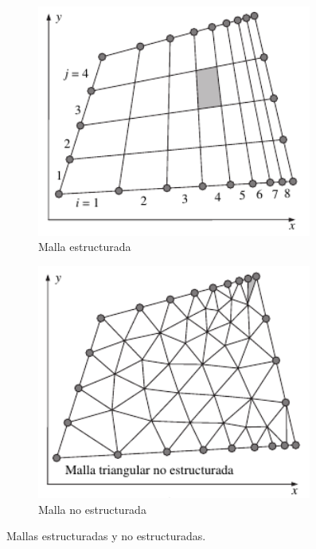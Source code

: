 \documentclass[letterpaper, openright, 12pt]{book}
\begin{document}
    \begin{figure}[htbp!]
        \centering
        \begin{subfigure}[c]{0.45\textwidth}
            \includegraphics[keepaspectratio,
                width=0.99\textwidth]{./img/malla-estructurada}
            \caption{Malla estructurada}
            \label{fig:malla_estructurada}
        \end{subfigure}
        \hfill
        \begin{subfigure}[c]{0.45\textwidth}
            \includegraphics[keepaspectratio,
                width=0.99\textwidth]{./img/malla-no-estructurada}
            \caption{Malla no estructurada}
            \label{fig:malla_no_estructurada}
        \end{subfigure}
        \caption[Mallas estructuradas y no estructuradas]{Mallas estructuradas
        y no estructuradas.\cite{cengel}}
        \label{fig:malla_estructurada_noestructurada}
    \end{figure}
\end{document}
